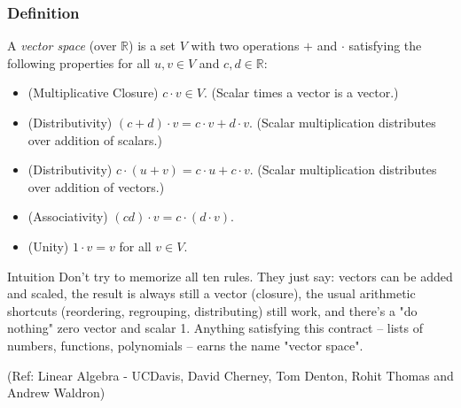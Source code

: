 \begin{frame}[fragile]
\frametitle{Definition}

\begin{definition} A \emph{vector space} (over $\mathbb{R}$) is a set $V$ with two operations $+$ and $\cdot$ satisfying the following properties for all $u, v \in V$ and $c, d \in \mathbb{R}$:

\begin{itemize}


\item[($\cdot$ i)] (Multiplicative Closure) $c\cdot v \in V$.  (Scalar times a vector is a vector.)

\item[($\cdot$ ii)] (Distributivity) $(c+d) \cdot v= c\cdot v + d\cdot v$.  (Scalar multiplication distributes over addition of scalars.)

\item[($\cdot$ iii)] (Distributivity) $c\cdot (u+v)= c\cdot u + c\cdot v$.  (Scalar multiplication distributes over addition of vectors.)

\item[($\cdot$ iv)] (Associativity) $ (cd)\cdot v = c \cdot (d \cdot v)$.

\item[($\cdot$ v)] (Unity) $1\cdot v = v$ for all $v \in V$.
\end{itemize}
\end{definition}

\begin{block}{Intuition}
Don't try to memorize all ten rules. They just say: vectors can be added and scaled, the result is always still a vector (closure), the usual arithmetic shortcuts (reordering, regrouping, distributing) still work, and there's a "do nothing" zero vector and scalar 1. Anything satisfying this contract -- lists of numbers, functions, polynomials -- earns the name "vector space".
\end{block}

\tiny{(Ref: Linear Algebra - UCDavis, David Cherney, Tom Denton, Rohit Thomas and Andrew Waldron)}

\end{frame}

